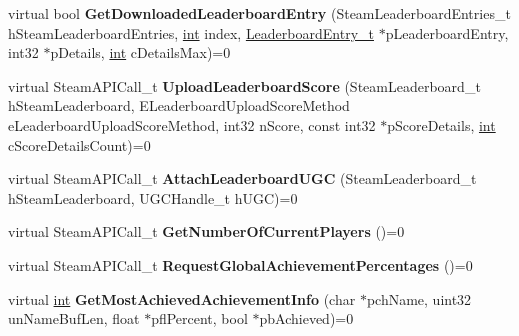 \begin{DoxyCompactItemize}
\item 
\hypertarget{classISteamUserStats_ac0fac175af5dcca627a9a866156ecd73}{}virtual bool {\bfseries Get\+Downloaded\+Leaderboard\+Entry} (Steam\+Leaderboard\+Entries\+\_\+t h\+Steam\+Leaderboard\+Entries, \hyperlink{SDL__thread_8h_a6a64f9be4433e4de6e2f2f548cf3c08e}{int} index, \hyperlink{structLeaderboardEntry__t}{Leaderboard\+Entry\+\_\+t} $\ast$p\+Leaderboard\+Entry, int32 $\ast$p\+Details, \hyperlink{SDL__thread_8h_a6a64f9be4433e4de6e2f2f548cf3c08e}{int} c\+Details\+Max)=0\label{classISteamUserStats_ac0fac175af5dcca627a9a866156ecd73}

\item 
\hypertarget{classISteamUserStats_a0c554468958a22fea2db5b215c3a629c}{}virtual Steam\+A\+P\+I\+Call\+\_\+t {\bfseries Upload\+Leaderboard\+Score} (Steam\+Leaderboard\+\_\+t h\+Steam\+Leaderboard, E\+Leaderboard\+Upload\+Score\+Method e\+Leaderboard\+Upload\+Score\+Method, int32 n\+Score, const int32 $\ast$p\+Score\+Details, \hyperlink{SDL__thread_8h_a6a64f9be4433e4de6e2f2f548cf3c08e}{int} c\+Score\+Details\+Count)=0\label{classISteamUserStats_a0c554468958a22fea2db5b215c3a629c}

\item 
\hypertarget{classISteamUserStats_ab3c5d514309cc0a44bf77890d777d4d9}{}virtual Steam\+A\+P\+I\+Call\+\_\+t {\bfseries Attach\+Leaderboard\+U\+G\+C} (Steam\+Leaderboard\+\_\+t h\+Steam\+Leaderboard, U\+G\+C\+Handle\+\_\+t h\+U\+G\+C)=0\label{classISteamUserStats_ab3c5d514309cc0a44bf77890d777d4d9}

\item 
\hypertarget{classISteamUserStats_a08b081140556ebbe9fc6662dfc13e5de}{}virtual Steam\+A\+P\+I\+Call\+\_\+t {\bfseries Get\+Number\+Of\+Current\+Players} ()=0\label{classISteamUserStats_a08b081140556ebbe9fc6662dfc13e5de}

\item 
\hypertarget{classISteamUserStats_a87cbff322dcb84273c6d49dbe0bc8975}{}virtual Steam\+A\+P\+I\+Call\+\_\+t {\bfseries Request\+Global\+Achievement\+Percentages} ()=0\label{classISteamUserStats_a87cbff322dcb84273c6d49dbe0bc8975}

\item 
\hypertarget{classISteamUserStats_acbcc624f16991042f28c4f0e4f0274ca}{}virtual \hyperlink{SDL__thread_8h_a6a64f9be4433e4de6e2f2f548cf3c08e}{int} {\bfseries Get\+Most\+Achieved\+Achievement\+Info} (char $\ast$pch\+Name, uint32 un\+Name\+Buf\+Len, float $\ast$pfl\+Percent, bool $\ast$pb\+Achieved)=0\label{classISteamUserStats_acbcc624f16991042f28c4f0e4f0274ca}


\end{DoxyCompactItemize}
